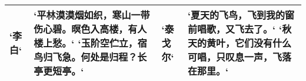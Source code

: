 \begin{table}[htbp]
\centering
\begin{tabularx}{350pt}{lXlX}
  \toprule
  `李白` & `平林漠漠烟如织，寒山一带伤心碧。暝色入高楼，有人楼上愁。`
  `玉阶空伫立，宿鸟归飞急。何处是归程？长亭更短亭。`& 
  `泰戈尔` & `夏天的飞鸟，飞到我的窗前唱歌，又飞去了。`
  `秋天的黄叶，它们没有什么可唱，只叹息一声，飞落在那里。`\\
  \bottomrule
\end{tabularx}
\end{table}
